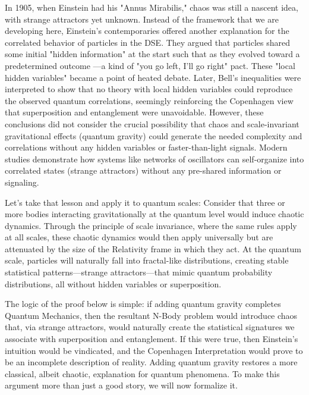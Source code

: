 \documentclass{article}
\begin{document}
In 1905, when Einstein had his "Annus Mirabilis," chaos was still a nascent idea, with strange attractors yet unknown. Instead of the framework that we are developing here, Einstein's contemporaries offered another explanation for the correlated behavior of particles in the DSE.  They argued that particles shared some initial "hidden information" at the start such that as they evolved toward a predetermined outcome —a kind of "you go left, I’ll go right" pact. These "local hidden variables" became a point of heated debate. Later, Bell's inequalities were interpreted to show that no theory with local hidden variables could reproduce the observed quantum correlations, seemingly reinforcing the Copenhagen view that superposition and entanglement were unavoidable.  However, these conclusions did not consider the crucial possibility that chaos and scale-invariant gravitational effects (quantum gravity) could generate the needed complexity and correlations without any hidden variables or faster-than-light signals. Modern studies demonstrate how systems like networks of oscillators can self-organize into correlated states (strange attractors) without any pre-shared information or signaling\cite{Watanabe-Strogatz1993}.

Let's take that lesson and apply it to quantum scales:  Consider that three or more bodies interacting gravitationally at the quantum level would induce chaotic dynamics. Through the principle of scale invariance, where the same rules apply at all scales, these chaotic dynamics would then apply universally but are attenuated by the size of the Relativity frame in which they act. At the quantum scale, particles will naturally fall into fractal-like distributions, creating stable statistical patterns—strange attractors—that mimic quantum probability distributions, all without hidden variables or superposition.

The logic of the proof below is simple: if adding quantum gravity completes Quantum Mechanics, then the resultant N-Body problem would introduce chaos that, via strange attractors, would naturally create the statistical signatures we associate with superposition and entanglement. If this were true, then Einstein’s intuition would be vindicated, and the Copenhagen Interpretation would prove to be an incomplete description of reality. Adding quantum gravity restores a more classical, albeit chaotic, explanation for quantum phenomena. To make this argument more than just a good story, we will now formalize it.
\end{document}
